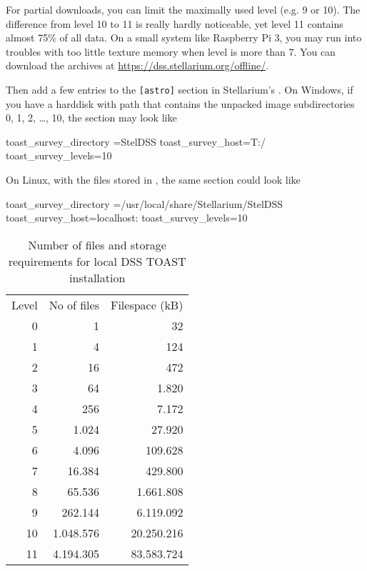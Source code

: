 For partial downloads, you can limit the maximally used level (e.g. 9
or 10). The difference from level 10 to 11 is really hardly
noticeable, yet level 11 contains almost 75\% of all data. On a small
system like Raspberry Pi 3, you may run into troubles with too little
texture memory when level is more than 7. You can download the archives at
\url{https://dss.stellarium.org/offline/}.

Then add a few entries to the \texttt{[astro]} section in
Stellarium's .  On Windows, if you have a harddisk
 with path  that contains the
unpacked image subdirectories 0, 1, 2, \ldots, 10, the section may look like
\begin{configfile}
[astro]
toast_survey_directory =StelDSS
toast_survey_host=T:/
toast_survey_levels=10
\end{configfile}
On Linux, with the files stored in , the same section could look like
\begin{configfile}
[astro]
toast_survey_directory =/usr/local/share/Stellarium/StelDSS
toast_survey_host=localhost:
toast_survey_levels=10
\end{configfile}

\begin{table}[htbp]
  \centering
\begin{tabular}{rrr}
Level & No of files & Filespace (kB)\\
0     &          1  &         32\\
1     &          4  &        124\\
2     &         16  &        472\\
3     &         64  &      1.820\\
4     &        256  &      7.172\\
5     &      1.024  &     27.920\\
6     &      4.096  &    109.628\\
7     &     16.384  &    429.800\\
8     &     65.536  &  1.661.808\\
9     &    262.144  &  6.119.092\\
10    &  1.048.576  & 20.250.216\\
11    &  4.194.305  & 83.583.724
\end{tabular}
\caption{Number of files and storage requirements for local DSS TOAST installation}
\label{tab:TOAST:levels}
\end{table}




